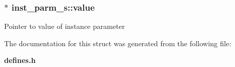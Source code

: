 \subsubsection{ $\ast$ inst\_\-parm\_\-s::value}\label{structinst__parm__s_m1}


Pointer to value of instance parameter 

The documentation for this struct was generated from the following file:\begin{CompactItemize}
\item 
{\bf defines.h}\end{CompactItemize}
